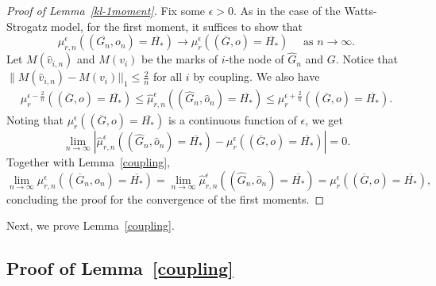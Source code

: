 \documentclass[10pt]{amsart}
\begin{document}
\begin{proof}[Proof of Lemma~\ref{kl-1moment}]
Fix some $\epsilon>0$. As in the case of the Watts-Strogatz model, for the first moment, it suffices to show that  $$\mu_{r, n}^\epsilon ((\overline{G_n}, o_n) = \overline{H_*}) \to \mu_r^\epsilon((\overline{G},o)= \overline{H_*})  \quad \text{ as $n \to \infty.$}$$
Let $M(\hat{v}_{i, n})$ and $M(v_{i})$ be the marks of $i$-the node of $\hat{G}_n$ and $G$. Notice that $\|M(\hat{v}_{i, n}) - M(v_{i})||_1 \leq \frac{2}{n}$ for all $i$ by coupling. We also have
\begin{align*}
    \mu_r^{\epsilon - \frac{2}{n}}((\overline{G},o)  = \overline{H_*}) 
 \leq \hat{\mu}_{r, n}^{\epsilon}((\hat{G}_n,\hat{o}_n)  = \overline{H_*}) \leq \mu_r^{\epsilon + \frac{2}{n}}((\overline{G},o)  = \overline{H_*}).
\end{align*}
Noting that $\mu_r^{\epsilon}((\overline{G}, o)  = \overline{H_*})$ is a continuous function of $\epsilon$, we get $$\lim_{n \to \infty} |\hat{\mu}_{r, n}^{\epsilon}((\hat{G}_n,\hat{o}_n)  = \overline{H_*}) - \mu_r^{\epsilon}((\overline{G},o)  = \overline{H_*})| = 0.$$
Together with Lemma~\ref{coupling}, $$\lim_{n\to\infty}\mu_{r, n}^\epsilon((\overline{G}_n,o_n)  = \overline{H_*}) =\lim_{n\to\infty}\hat{\mu}_{r,n}^\epsilon((\hat{G}_n,\hat{o}_n)  = \overline{H_*}) =\mu_r^{\epsilon}((\overline{G},o)  = \overline{H_*}),$$
concluding the proof for the convergence of the first moments. 
\end{proof}

Next, we prove Lemma~\ref{coupling}.

\subsection*{Proof of Lemma~\ref{coupling}}
\end{document}
